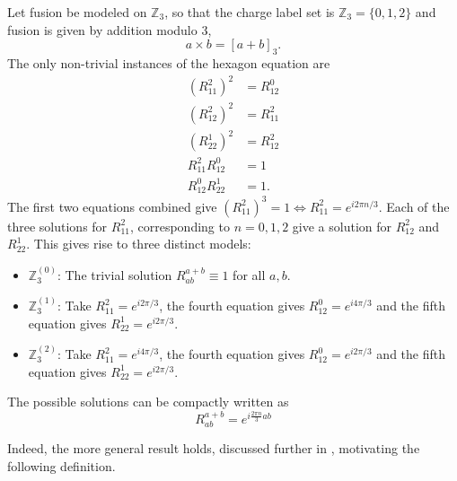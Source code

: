 \begin{example}[$\mathbb{Z}_3^{(n)}$]
  Let fusion be modeled on $\mathbb{Z}_3$, so that the charge label set is $\mathbb{Z}_3 = \{0, 1, 2\}$ and fusion is given by addition modulo 3,
  \begin{equation}
    a \times b = [a + b]_3.
  \end{equation}
  The only non-trivial instances of the hexagon equation are
  \begin{equation}
    \begin{aligned}
      \left( R_{11}^2 \right)^2 &= R_{12}^0 \\
      \left( R_{12}^2 \right)^2 &= R_{11}^2 \\
      \left( R_{22}^1 \right)^2 &= R_{12}^2 \\
      R_{11}^2 R_{12}^0 &= 1 \\
      R_{12}^0 R_{22}^1 &= 1.
    \end{aligned}
  \end{equation}
  The first two equations combined give $\left( R_{11}^2 \right)^3 = 1 \iff R_{11}^2 = e^{i2πn/3}$. Each of the three solutions for $R_{11}^2$, corresponding to $n = 0, 1, 2$ give a solution for $R_{12}^2$ and $R_{22}^1$. This gives rise to three distinct models:
  \begin{itemize}
    \item $\mathbb{Z}_3^{(0)}$: The trivial solution $R_{ab}^{a+b} \equiv 1$ for all $a, b$.
    \item $\mathbb{Z}_3^{(1)}$: Take $R_{11}^2 = e^{i2π/3}$, the fourth equation gives $R_{12}^0 = e^{i4π/3}$ and the fifth equation gives $R_{22}^1 = e^{i2π/3}$.
    \item $\mathbb{Z}_3^{(2)}$: Take $R_{11}^2 = e^{i4π/3}$, the fourth equation gives $R_{12}^0 = e^{i2π/3}$ and the fifth equation gives $R_{22}^1 = e^{i2π/3}$.
  \end{itemize}
  The possible solutions can be compactly written as
  \begin{equation}
    R_{ab}^{a+b} = e^{i\frac{2πn}{3}ab}
  \end{equation}
\end{example}

Indeed, the more general result holds, discussed further in \cite{bonderson}, motivating the following definition.

